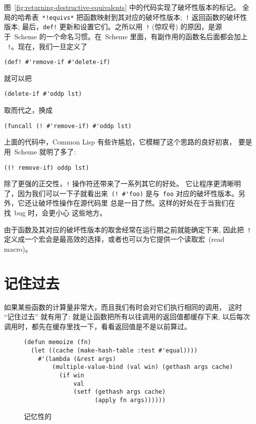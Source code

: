 图~\ref{fig:returning-destructive-equivalents} 中的代码实现了破坏性版本的标记。
全局的哈希表~\verb|*!equivs*| 把函数映射到其对应的破坏性版本;~\verb|!| 
返回函数的破坏性版本; 最后，\verb|def!| 更新和设置它们。之所以用~\verb|!| (惊叹号) 
的原因，是源于~Scheme 的一个命名习惯。在~Scheme 里面，有副作用的函数名后面都会加上
~\texttt{!}。现在，我们一旦定义了
\begin{lstlisting}
(def! #'remove-if #'delete-if)
\end{lstlisting}
就可以把
\begin{lstlisting}
(delete-if #'oddp lst)
\end{lstlisting}
取而代之，换成
\begin{lstlisting}
(funcall (! #'remove-if) #'oddp lst)
\end{lstlisting}
上面的代码中，Common Lisp 有些许尴尬，它模糊了这个思路的良好初衷，
要是用~Scheme 就明了多了:
\begin{lstlisting}
((! remove-if) oddp lst)
\end{lstlisting}

除了更强的正交性，\verb|!| 操作符还带来了一系列其它的好处。
它让程序更清晰明了，因为我们可以一下子就看出来~\verb|(! #'foo)|
是与~\verb|foo| 对应的破坏性版本。另外，它还让破坏性操作在源代码里
总是一目了然。这样的好处在于当我们在找~bug 时，会更小心
这些地方。

由于函数及其对应的破坏性版本的取舍经常在运行期之前就能确定下来,
因此把~\verb|!| 定义成一个宏会是最高效的选择，或者也可以为它提供一个读取宏~(read macro)。

\section{记住过去}
\label{sec:memoizing}

如果某些函数的计算量非常大，而且我们有时会对它们执行相同的调用，
这时 ``记住过去'' 就有用了: 就是让函数把所有以往调用的返回值都缓存下来,
以后每次调用时，都先在缓存里找一下，看看返回值是不是以前算过。

\begin{figure}
\begin{lstlisting}
(defun memoize (fn)
  (let ((cache (make-hash-table :test #'equal))))
    #'(lambda (&rest args)
        (multiple-value-bind (val win) (gethash args cache)
          (if win
              val
              (setf (gethash args cache)
                    (apply fn args))))))
\end{lstlisting}
  \caption{记忆性的\utility{}}
  \label{fig:memoizing_utility}
\end{figure}

